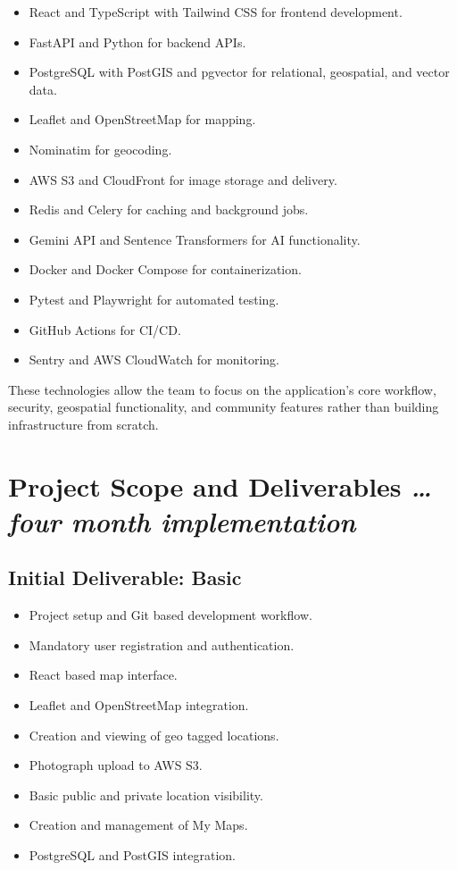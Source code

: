 \documentclass[11pt,a4paper]{article}
\newcommand{\BvrHint}[1]{%
  {\normalfont\normalsize\itshape\hfill #1}}
\begin{document}
\begin{itemize}[leftmargin=0.7cm]
    \item React and TypeScript with Tailwind CSS for frontend development.
    \item FastAPI and Python for backend APIs.
    \item PostgreSQL with PostGIS and pgvector for relational, geospatial,
    and vector data.
    \item Leaflet and OpenStreetMap for mapping.
    \item Nominatim for geocoding.
    \item AWS S3 and CloudFront for image storage and delivery.
    \item Redis and Celery for caching and background jobs.
    \item Gemini API and Sentence Transformers for AI functionality.
    \item Docker and Docker Compose for containerization.
    \item Pytest and Playwright for automated testing.
    \item GitHub Actions for CI/CD.
    \item Sentry and AWS CloudWatch for monitoring.
\end{itemize}

These technologies allow the team to focus on the application's core
workflow, security, geospatial functionality, and community features rather
than building infrastructure from scratch.

\section{Project Scope and Deliverables%
  \BvrHint{\ldots four month implementation}}

\subsection{Initial Deliverable: Basic}

\begin{itemize}[leftmargin=0.7cm]
    \item Project setup and Git based development workflow.
    \item Mandatory user registration and authentication.
    \item React based map interface.
    \item Leaflet and OpenStreetMap integration.
    \item Creation and viewing of geo tagged locations.
    \item Photograph upload to AWS S3.
    \item Basic public and private location visibility.
    \item Creation and management of My Maps.
    \item PostgreSQL and PostGIS integration.
\end{itemize}
\end{document}
